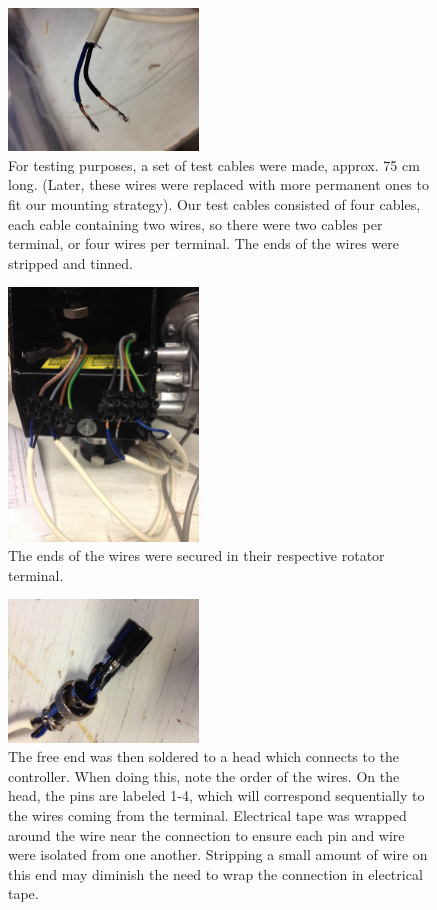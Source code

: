 \documentclass[11pt]{article} %
\begin{document}
\begin{figure}
  \centering
  \caption{For testing purposes, a set of test cables were made, approx. 75 cm long. (Later, these wires were replaced with more permanent ones to fit our mounting strategy). Our test cables consisted of four cables, each cable containing two wires, so there were two cables per terminal, or four wires per terminal. The ends of the wires were stripped and tinned.}
  \includegraphics[width=0.45\textwidth]{wiring/06.jpeg}
\end{figure}


\begin{figure}
  \centering
  \caption{The ends of the wires were secured in their respective rotator terminal.}
  \includegraphics[width=0.45\textwidth]{wiring/07.jpeg}
\end{figure}


\begin{figure}
  \centering
  \caption{The free end was then soldered to a head which connects to the controller. When doing this, note the order of the wires. On the head, the pins are labeled 1-4, which will correspond sequentially to the wires coming from the terminal. Electrical tape was wrapped around the wire near the connection to ensure each pin and wire were isolated from one another. Stripping a small amount of wire on this end may diminish the need to wrap the connection in electrical tape.}
  \includegraphics[width=0.45\textwidth]{wiring/08.jpeg}
\end{figure}
\end{document}
